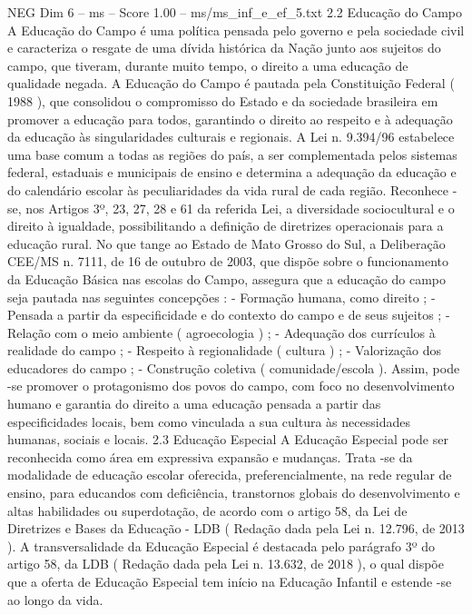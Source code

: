 \begin{textsample}{NEG Dim 6 – ms – Score 1.00 – ms/ms\_inf\_e\_ef\_5.txt}  \label{ex:f6_neg_232}
2.2 Educação do Campo A Educação do Campo é uma política pensada pelo governo e pela sociedade civil e caracteriza o resgate de uma dívida histórica da Nação junto aos sujeitos do campo, que tiveram, durante muito tempo, o direito a uma educação de qualidade negada.
A Educação do Campo é pautada pela Constituição Federal ( 1988 ), que consolidou o compromisso do Estado e da sociedade brasileira em promover a educação para todos, garantindo o direito ao respeito e à adequação da educação às singularidades culturais e regionais.
A Lei n. 9.394/96 estabelece uma base comum a todas as regiões do país, a ser complementada pelos sistemas federal, estaduais e municipais de ensino e determina a adequação da educação e do calendário escolar às peculiaridades da vida rural de cada região.
Reconhece -se, nos Artigos 3º, 23, 27, 28 e 61 da referida Lei, a diversidade sociocultural e o direito à igualdade, possibilitando a definição de diretrizes operacionais para a educação rural.
No que tange ao Estado de Mato Grosso do Sul, a Deliberação CEE/MS n. 7111, de 16 de outubro de 2003, que dispõe sobre o funcionamento da Educação Básica nas escolas do Campo, assegura que a educação do campo seja pautada nas seguintes concepções : - Formação humana, como direito ; - Pensada a partir da especificidade e do contexto do campo e de seus sujeitos ; - Relação com o meio ambiente ( agroecologia ) ; - Adequação dos currículos à realidade do campo ; - Respeito à regionalidade ( cultura ) ; - Valorização dos educadores do campo ; - Construção coletiva ( comunidade/escola ).
Assim, pode -se promover o protagonismo dos povos do campo, com foco no desenvolvimento humano e garantia do direito a uma educação pensada a partir das especificidades locais, bem como vinculada a sua cultura às necessidades humanas, sociais e locais. 2.3 Educação Especial A Educação Especial pode ser reconhecida como área em expressiva expansão e mudanças.
Trata -se da modalidade de educação escolar oferecida, preferencialmente, na rede regular de ensino, para educandos com deficiência, transtornos globais do desenvolvimento e altas habilidades ou superdotação, de acordo com o artigo 58, da Lei de Diretrizes e Bases da Educação - LDB ( Redação dada pela Lei n. 12.796, de 2013 ).
A transversalidade da Educação Especial é destacada pelo parágrafo 3º do artigo 58, da LDB ( Redação dada pela Lei n. 13.632, de 2018 ), o qual dispõe que a oferta de Educação Especial tem início na Educação Infantil e estende -se ao longo da vida.

\end{textsample}
